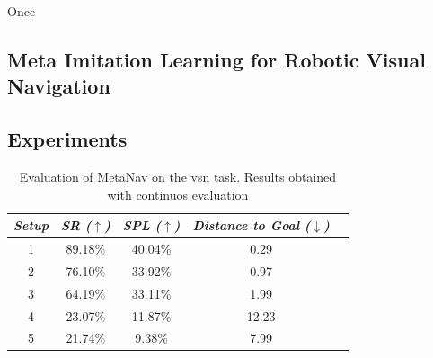 Once

\subsection{Meta Imitation Learning for Robotic Visual Navigation}\label{subsec:meta-imitation-learning-for-robotic-visual-navigation}

\subsection{Experiments}\label{subsec:experiments_metanav}

\begin{table}[t]
    \centering
    \begin{tabular}{c|cccc}
        \toprule
        \textit{\textbf{Setup}} & \textit{\textbf{SR ($\uparrow$)}} & \textbf{\textit{SPL ($\uparrow$)}} & \textit{\textbf{Distance to Goal ($\downarrow$)}} \\ \midrule
        1                       & 89.18\%                           & 40.04\%                            & 0.29                                              \\
        2                       & 76.10\%                           & 33.92\%                            & 0.97                                              \\
        3                       & 64.19\%                           & 33.11\%                            & 1.99                                              \\
        4                       & 23.07\%                           & 11.87\%                            & 12.23                                             \\
        5                       & 21.74\%                           & 9.38\%                             & 7.99                                              \\
    \end{tabular}
    \caption{Evaluation of MetaNav on the \acrshort{vsn} task. Results obtained with continuos evaluation}
    \label{tab:metanav_continuos}
\end{table}


